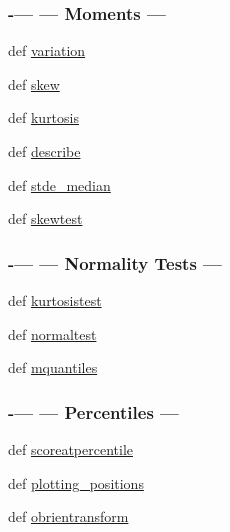\begin{DoxyCompactItemize}
\begin{DoxyCompactList}
 \subsubsection*{-\/--- --- Moments --- }\end{DoxyCompactList}\item 
def \hyperlink{namespacescipy_1_1stats_1_1mstats__basic_ac00b11ab95bbb4d18274975b5ce85494}{variation}
\item 
def \hyperlink{namespacescipy_1_1stats_1_1mstats__basic_a3ff3272195b8024061622a2d41bd28a0}{skew}
\item 
def \hyperlink{namespacescipy_1_1stats_1_1mstats__basic_a22f230466497c4bf93a72cbb8e51f03f}{kurtosis}
\item 
def \hyperlink{namespacescipy_1_1stats_1_1mstats__basic_abbd1398fc9074fe2d3cbe42131077842}{describe}
\item 
def \hyperlink{namespacescipy_1_1stats_1_1mstats__basic_ae789dd1fb112dff1d457e7a024fcf1db}{stde\+\_\+median}
\item 
def \hyperlink{namespacescipy_1_1stats_1_1mstats__basic_a1ff943648527aa592314f3059bf7381d}{skewtest}
\begin{DoxyCompactList}\small\item\em 

 \subsubsection*{-\/--- --- Normality Tests --- }\end{DoxyCompactList}\item 
def \hyperlink{namespacescipy_1_1stats_1_1mstats__basic_ace7874a9479ea76016263028e0b4b6b0}{kurtosistest}
\item 
def \hyperlink{namespacescipy_1_1stats_1_1mstats__basic_ab464e08dd893d9c94ee70d477d46f6b6}{normaltest}
\item 
def \hyperlink{namespacescipy_1_1stats_1_1mstats__basic_a832d9b2a1ff5cc0dd44b135e02b6f1fc}{mquantiles}
\begin{DoxyCompactList}\small\item\em 

 \subsubsection*{-\/--- --- Percentiles --- }\end{DoxyCompactList}\item 
def \hyperlink{namespacescipy_1_1stats_1_1mstats__basic_ab58d2d494891204dafcd9c777b50e8b9}{scoreatpercentile}
\item 
def \hyperlink{namespacescipy_1_1stats_1_1mstats__basic_aa521b298aa4dbc04d199c35d6fadaf32}{plotting\+\_\+positions}
\item 
def \hyperlink{namespacescipy_1_1stats_1_1mstats__basic_a7cd41c840c53013f84f26c72966368ed}{obrientransform}
\begin{DoxyCompactList}\small\item\em 


\end{DoxyCompactList}
\end{DoxyCompactItemize}
